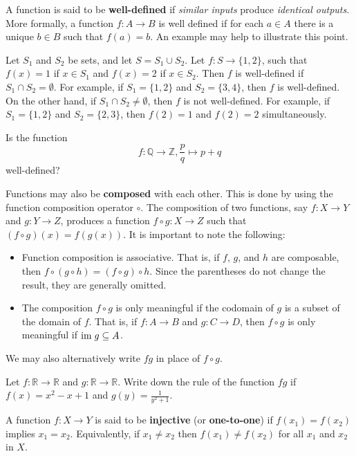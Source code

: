 \newpage

A function is said to be \textbf{well-defined} if \textit{similar inputs} produce \textit{identical outputs}. More formally, a function $f: A \to B$ is well defined if for each $a \in A$ there is a unique $b \in B$ such that $f(a) = b$. An example may help to illustrate this point.
\begin{example}
    Let $S_1$ and $S_2$ be sets, and let $S = S_1 \cup S_2$. Let $f: S \to \{1, 2\}$, such that $f(x) = 1$ if $x \in S_1$ and $f(x) = 2$ if $x \in S_2$. Then $f$ is well-defined if $S_1 \cap S_2 = \emptyset$. For example, if $S_1 = \{1, 2\}$ and $S_2 = \{3, 4\}$, then $f$ is well-defined. On the other hand, if $S_1 \cap S_2 \neq \emptyset$, then $f$ is not well-defined. For example, if $S_1 = \{1, 2\}$ and $S_2 = \{2, 3\}$, then $f(2) = 1$ and $f(2) = 2$ simultaneously.
\end{example}
\begin{exercise}
    Is the function
    \[
        f: \mathbb{Q} \to \mathbb{Z}, \frac pq \mapsto p + q    
    \]
    well-defined?
\end{exercise}

Functions may also be \textbf{composed} with each other. This is done by using the function composition operator $\circ$. The composition of two functions, say $f: X \to Y$ and $g: Y \to Z$, produces a function $f \circ g: X \to Z$ such that $(f \circ g)(x) = f(g(x))$. It is important to note the following:
\begin{itemize}
    \item Function composition is associative. That is, if $f$, $g$, and $h$ are composable, then $f \circ (g \circ h) = (f \circ g) \circ h$. Since the parentheses do not change the result, they are generally omitted.
    \item The composition $f \circ g$ is only meaningful if the codomain of $g$ is a subset of the domain of $f$. That is, if $f: A \to B$ and $g: C \to D$, then $f \circ g$ is only meaningful if $\mathrm{im}\; g \subseteq A$.
\end{itemize}
We may also alternatively write $fg$ in place of $f \circ g$.

\begin{exercise}
    Let $f: \mathbb{R} \to \mathbb{R}$ and $g: \mathbb{R} \to \mathbb{R}$. Write down the rule of the function $fg$ if $f(x) = x^2 - x + 1$ and $g(y) = \frac1{y^2+1}$.
\end{exercise}

A function $f: X \to Y$ is said to be \textbf{injective} (or \textbf{one-to-one}) if $f(x_1) = f(x_2)$ implies $x_1 = x_2$. Equivalently, if $x_1 \neq x_2$ then $f(x_1) \neq f(x_2)$ for all $x_1$ and $x_2$ in $X$.


